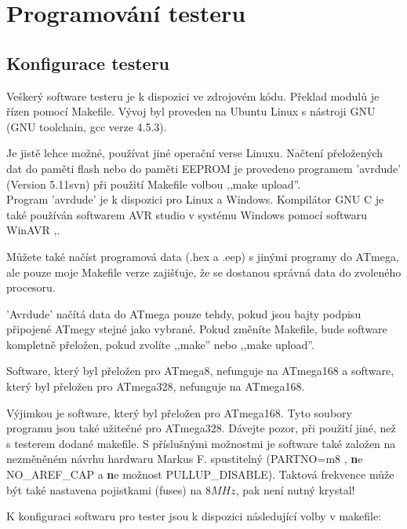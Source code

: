 \chapter{Programování testeru}

\label{sec:config}
\section{Konfigurace testeru}
Veškerý software testeru je k dispozici ve zdrojovém kódu.
Překlad modulů je řízen pomocí Makefile. Vývoj byl proveden
na Ubuntu Linux s nástroji GNU (GNU toolchain, gcc verze 4.5.3).

Je jistě lehce možné, používat jiné operační verse Linuxu.
Načtení přeložených dat do paměti flash nebo do paměti EEPROM
je provedeno programem 'avrdude' \cite{avrdude} (Version 5.11svn) při použití Makefile volbou ,,make upload''.\\
 Program 'avrdude' je k dispozici pro Linux a Windows.
Kompilátor GNU C je také používán softwarem AVR studio v systému Windows pomocí softwaru WinAVR \cite{winavr1},\cite{winavr2}.

Můžete také načíst programová data (.hex a .eep) s jinými programy do ATmega,
ale pouze moje Makefile  verze zajišťuje, že se dostanou správná data do zvoleného procesoru.

'Avrdude' načítá data do ATmega pouze tehdy, pokud jsou bajty podpisu připojené ATmegy stejné jako vybrané.
Pokud změníte Makefile, bude software kompletně přeložen, pokud zvolíte ,,make'' nebo
,,make upload''.

Software, který byl přeložen pro ATmega8, nefunguje na ATmega168 a
software, který byl přeložen pro ATmega328, nefunguje na ATmega168.

Výjimkou je software, který byl přeložen pro ATmega168. Tyto soubory programu
jsou také užitečné pro ATmega328.
Dávejte pozor, při použití jiné, než s testerem dodané makefile.
S příslušnými možnostmi je software také založen na nezměněném návrhu hardwaru
Markus F. spustitelný (PARTNO=m8 , {\textbf ne} NO\_AREF\_CAP a {\textbf ne} možnost PULLUP\_DISABLE).
Taktová frekvence může být také nastavena pojistkami (fuses) na \(8MHz\), pak není nutný krystal!

K konfiguraci softwaru pro tester jsou k dispozici následující volby v makefile:

